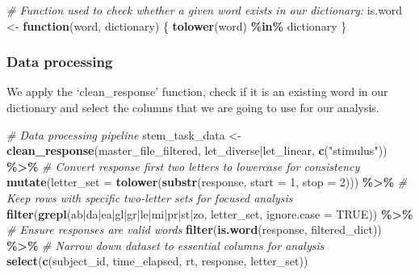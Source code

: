 \documentclass[
]{article}
\newenvironment{Shaded}{\begin{snugshade}}{\end{snugshade}}
\newcommand{\AttributeTok}[1]{\textcolor[rgb]{0.13,0.29,0.53}{#1}}
\newcommand{\CommentTok}[1]{\textcolor[rgb]{0.56,0.35,0.01}{\textit{#1}}}
\newcommand{\ConstantTok}[1]{\textcolor[rgb]{0.56,0.35,0.01}{#1}}
\newcommand{\ControlFlowTok}[1]{\textcolor[rgb]{0.13,0.29,0.53}{\textbf{#1}}}
\newcommand{\DecValTok}[1]{\textcolor[rgb]{0.00,0.00,0.81}{#1}}
\newcommand{\FunctionTok}[1]{\textcolor[rgb]{0.13,0.29,0.53}{\textbf{#1}}}
\newcommand{\NormalTok}[1]{#1}
\newcommand{\OtherTok}[1]{\textcolor[rgb]{0.56,0.35,0.01}{#1}}
\newcommand{\SpecialCharTok}[1]{\textcolor[rgb]{0.81,0.36,0.00}{\textbf{#1}}}
\newcommand{\StringTok}[1]{\textcolor[rgb]{0.31,0.60,0.02}{#1}}
\begin{document}
\begin{Shaded}
\begin{Highlighting}[]
\CommentTok{\# Function used to check whether a given word exists in our dictionary:}
\NormalTok{is.word }\OtherTok{\textless{}{-}} \ControlFlowTok{function}\NormalTok{(word, dictionary) \{}
  \FunctionTok{tolower}\NormalTok{(word) }\SpecialCharTok{\%in\%}\NormalTok{ dictionary}
\NormalTok{\}}
\end{Highlighting}
\end{Shaded}

\hypertarget{data-processing}{%
\subsubsection{Data processing}\label{data-processing}}

We apply the `clean\_response' function, check if it is an existing word
in our dictionary and select the columns that we are going to use for
our analysis.

\begin{Shaded}
\begin{Highlighting}[]
\CommentTok{\# Data processing pipeline}
\NormalTok{stem\_task\_data }\OtherTok{\textless{}{-}} \FunctionTok{clean\_response}\NormalTok{(master\_file\_filtered,}
                                 \StringTok{\textquotesingle{}let\_diverse|let\_linear\textquotesingle{}}\NormalTok{,}
                                 \FunctionTok{c}\NormalTok{(}\StringTok{"stimulus"}\NormalTok{)) }\SpecialCharTok{\%\textgreater{}\%} 
  \CommentTok{\# Convert \textquotesingle{}response\textquotesingle{} first two letters to lowercase for consistency}
  \FunctionTok{mutate}\NormalTok{(}\AttributeTok{letter\_set =} \FunctionTok{tolower}\NormalTok{(}\FunctionTok{substr}\NormalTok{(response,}
                                     \AttributeTok{start =} \DecValTok{1}\NormalTok{,}
                                     \AttributeTok{stop =} \DecValTok{2}\NormalTok{))) }\SpecialCharTok{\%\textgreater{}\%} 
  \CommentTok{\# Keep rows with specific two{-}letter sets for focused analysis}
  \FunctionTok{filter}\NormalTok{(}\FunctionTok{grepl}\NormalTok{(}\StringTok{\textquotesingle{}ab|da|ea|gl|gr|le|mi|pr|st|zo\textquotesingle{}}\NormalTok{,}
\NormalTok{               letter\_set, }\AttributeTok{ignore.case =} \ConstantTok{TRUE}\NormalTok{)) }\SpecialCharTok{\%\textgreater{}\%} 
  \CommentTok{\# Ensure responses are valid words }
  \FunctionTok{filter}\NormalTok{(}\FunctionTok{is.word}\NormalTok{(response, filtered\_dict)) }\SpecialCharTok{\%\textgreater{}\%}  
  \CommentTok{\# Narrow down dataset to essential columns for analysis}
  \FunctionTok{select}\NormalTok{(}\FunctionTok{c}\NormalTok{(}\StringTok{\textquotesingle{}subject\_id\textquotesingle{}}\NormalTok{, }\StringTok{\textquotesingle{}time\_elapsed\textquotesingle{}}\NormalTok{,}
           \StringTok{\textquotesingle{}rt\textquotesingle{}}\NormalTok{, }\StringTok{\textquotesingle{}response\textquotesingle{}}\NormalTok{, }\StringTok{\textquotesingle{}letter\_set\textquotesingle{}}\NormalTok{)) }
\end{Highlighting}
\end{Shaded}
\end{document}
